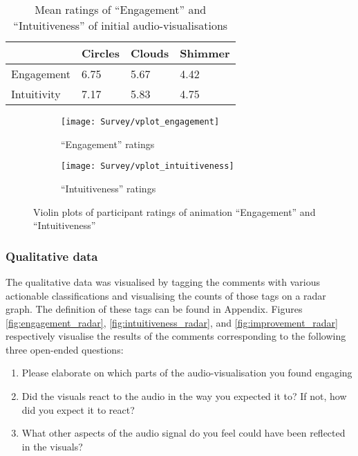 \documentclass[../initial_thesis.tex]{subfiles}
\begin{document}
\begin{table}[]
  \centering
\begin{tabular}{|l|l|l|l|}
\hline
\rowcolor[HTML]{FFCE93} 
            & Circles & Clouds & Shimmer \\ \hline
Engagement  & 6.75    & 5.67   & 4.42    \\ \hline
Intuitivity & 7.17    & 5.83   & 4.75    \\ \hline
\end{tabular}
\caption{Mean ratings of ``Engagement'' and ``Intuitiveness'' of initial audio-visualisations}
\label{tab:meantable}
\end{table}

\begin{figure}
  \begin{subfigure}{0.5\textwidth}
    \centering
    \texttt{[image: Survey/vplot\_engagement]}
    \caption{``Engagement'' ratings}
    \label{fig:engagement_ratings}
  \end{subfigure}
  \begin{subfigure}{0.5\textwidth}
    \centering
    \texttt{[image: Survey/vplot\_intuitiveness]}
    \caption{``Intuitiveness'' ratings}
    \label{fig:intuitive_ratings}
  \end{subfigure}
  \caption{Violin plots of participant ratings of animation ``Engagement'' and ``Intuitiveness''}
  \label{fig:vplot_ratings}
\end{figure}

\subsubsection{Qualitative data}
The qualitative data was visualised by tagging the comments with various actionable classifications and visualising the counts of those tags on a radar graph. The definition of these tags can be found in Appendix. %
Figures \ref{fig:engagement_radar}, \ref{fig:intuitiveness_radar}, and \ref{fig:improvement_radar} respectively visualise the results of the comments corresponding to the following three open-ended questions:

\begin{enumerate}
\item {Please elaborate on which parts of the audio-visualisation you found engaging}
\item {Did the visuals react to the audio in the way you expected it to? If not, how did you expect it to react?}
\item {What other aspects of the audio signal do you feel could have been reflected in the visuals?}
\end{enumerate}
\end{document}

